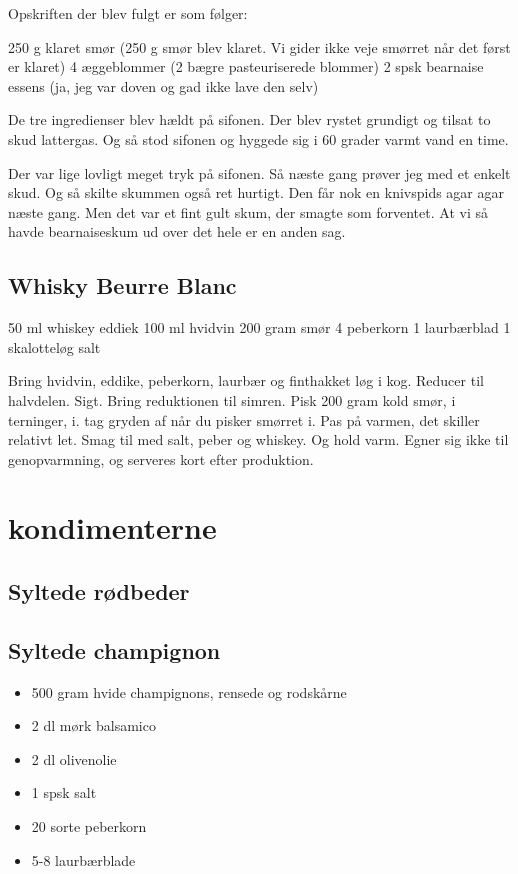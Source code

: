 \documentclass[
]{book}
\providecommand{\tightlist}{%
  \setlength{\itemsep}{0pt}\setlength{\parskip}{0pt}}
\begin{document}
Opskriften der blev fulgt er som følger:

250 g klaret smør (250 g smør blev klaret. Vi gider ikke veje smørret når det først er klaret)
4 æggeblommer (2 bægre pasteuriserede blommer)
2 spsk bearnaise essens (ja, jeg var doven og gad ikke lave den selv)

De tre ingredienser blev hældt på sifonen. Der blev rystet grundigt og tilsat to skud lattergas. Og så stod sifonen og hyggede sig i 60 grader varmt vand en time.

Der var lige lovligt meget tryk på sifonen. Så næste gang prøver jeg med et enkelt skud. Og så skilte skummen også ret hurtigt. Den får nok en knivspids agar agar næste gang. Men det var et fint gult skum, der smagte som forventet. At vi så havde bearnaiseskum ud over det hele er en anden sag.

\hypertarget{whisky-beurre-blanc}{%
\section{Whisky Beurre Blanc}\label{whisky-beurre-blanc}}

50 ml whiskey eddiek
100 ml hvidvin
200 gram smør
4 peberkorn
1 laurbærblad
1 skalotteløg
salt

Bring hvidvin, eddike, peberkorn, laurbær og finthakket løg i kog. Reducer
til halvdelen. Sigt.
Bring reduktionen til simren. Pisk 200 gram kold smør, i terninger, i.
tag gryden af når du pisker smørret i. Pas på varmen, det skiller relativt let.
Smag til med salt, peber og whiskey. Og hold varm. Egner sig ikke til
genopvarmning, og serveres kort efter produktion.

\hypertarget{kondimenterne}{%
\chapter{kondimenterne}\label{kondimenterne}}

\hypertarget{syltede-ruxf8dbeder}{%
\section{Syltede rødbeder}\label{syltede-ruxf8dbeder}}

\hypertarget{syltede-champignon}{%
\section{Syltede champignon}\label{syltede-champignon}}

\begin{itemize}
\tightlist
\item
  500 gram hvide champignons, rensede og rodskårne
\item
  2 dl mørk balsamico
\item
  2 dl olivenolie
\item
  1 spsk salt
\item
  20 sorte peberkorn
\item
  5-8 laurbærblade
\end{itemize}
\end{document}
